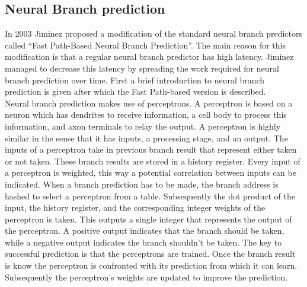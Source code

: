 \subsection{Neural Branch prediction}
\label{sec:neural}
In 2003 Jiminez \cite{neural} proposed a modification of the standard neural branch predictors called \enquote{Fast Path-Based Neural Branch Prediction}.
The main reason for this modification is that a regular neural branch predictor has high latency.
Jiminez managed to decrease this latency by spreading the work required for neural branch prediction over time.
First a brief introduction to neural branch prediction is given after which the Fast Path-based version is described.\\

Neural branch prediction makes use of perceptrons.
A perceptron is based on a neuron which has dendrites to receive information, a cell body to process this information, and axon terminals to relay the output.
A perceptron is highly similar in the sense that it has inputs, a processing stage, and an output.
The inputs of a perceptron take in previous branch result that represent either taken or not taken.
These branch results are stored in a history register.
Every input of a perceptron is weighted, this way a potential correlation between inputs can be indicated.
 When a branch prediction has to be made, the branch address is hashed to select a perceptron from a table.
Subsequently the dot product of the input, the history register, and the corresponding integer weights of the perceptron is taken.
This outputs a single integer that represents the output of the perceptron.
A positive output indicates that the branch should be taken, while a negative output indicates the branch shouldn't be taken.
The key to successful prediction is that the perceptrons are trained.
Once the branch result is know the perceptron is confronted with its prediction from which it can learn.
Subsequently the perceptron's weights are updated to improve the prediction.

